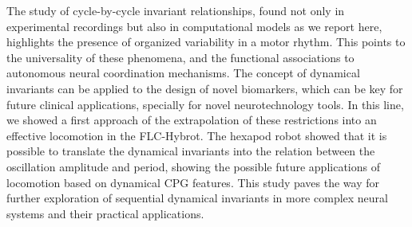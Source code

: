 The study of cycle-by-cycle invariant relationships, found not only in experimental recordings but also in computational models as we report here, highlights the presence of organized variability in a motor rhythm. This points to the universality of these phenomena, and the functional associations to autonomous neural coordination mechanisms. The concept of dynamical invariants can be applied to the design of novel biomarkers, which can be key for future clinical applications, specially for novel neurotechnology tools. In this line, we showed a first approach of the extrapolation of these restrictions into an effective locomotion in the FLC-Hybrot. The hexapod robot  showed that it is possible to translate the dynamical invariants into the relation between the oscillation amplitude and period, showing the possible future applications of locomotion based on dynamical CPG features. This study paves the way for further exploration of sequential dynamical invariants in more complex neural systems and their practical applications.









